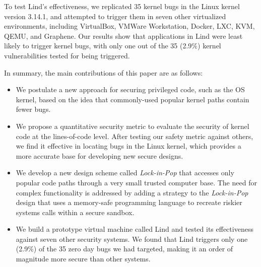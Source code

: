 To test Lind's effectiveness, we replicated 35 kernel bugs in the Linux kernel version 3.14.1,
and attempted to trigger them in seven other virtualized environments,
including VirtualBox, VMWare Workstation,
Docker, LXC, KVM, QEMU, and Graphene.
Our results show that applications in Lind were least likely to trigger kernel bugs,
with only one out of the 35 (2.9\%) kernel vulnerabilities tested for being triggered.

In summary, the main contributions of this paper are as follows:

\begin{itemize}\setlength\itemsep{0em}
\item
We postulate a new approach for securing privileged code,
such as the OS kernel, based on the idea that commonly-used popular kernel paths contain fewer bugs.

\item
We propose a quantitative security metric to evaluate the security of kernel code
 at the lines-of-code level.
After testing our safety metric against others, we find it effective in locating
 bugs in the Linux kernel,
which provides a more accurate base for developing new secure designs.

\item
We develop a new design scheme called \emph{Lock-in-Pop} that accesses only popular code paths
through a very small trusted computer base.
The need for complex functionality is addressed by adding a strategy to the \emph{Lock-in-Pop} design that
uses a memory-safe programming language to recreate riskier systems calls within a secure sandbox.

\item
We build a prototype virtual machine called Lind and tested its effectiveness
against seven other security systems. We found that Lind triggers only one
(2.9\%) of the 35 zero day bugs we had targeted,
making it an order of magnitude more secure than other systems.
\end{itemize}

%
